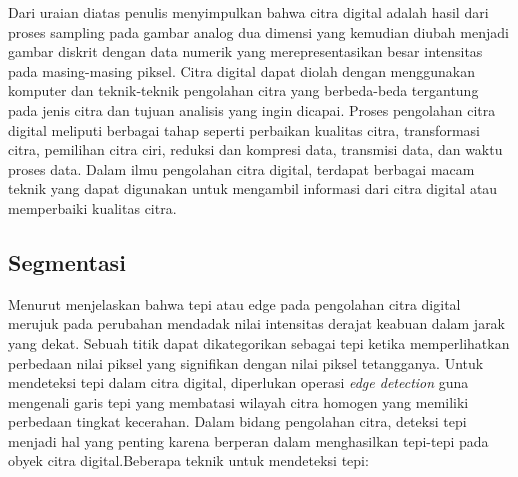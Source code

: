 Dari uraian diatas penulis menyimpulkan bahwa citra digital adalah hasil dari proses sampling pada gambar analog dua dimensi yang kemudian diubah menjadi gambar diskrit dengan data numerik yang merepresentasikan besar intensitas pada masing-masing piksel. Citra digital dapat diolah dengan menggunakan komputer dan teknik-teknik pengolahan citra yang berbeda-beda tergantung pada jenis citra dan tujuan analisis yang ingin dicapai. Proses pengolahan citra digital meliputi berbagai tahap seperti perbaikan kualitas citra, transformasi citra, pemilihan citra ciri, reduksi dan kompresi data, transmisi data, dan waktu proses data. Dalam ilmu pengolahan citra digital, terdapat berbagai macam teknik yang dapat digunakan untuk mengambil informasi dari citra digital atau memperbaiki kualitas citra.

\subsection{Segmentasi}

Menurut \textcite{IPI1759345} menjelaskan bahwa tepi atau edge pada pengolahan citra digital merujuk pada perubahan mendadak nilai intensitas derajat keabuan dalam jarak yang dekat. Sebuah titik dapat dikategorikan sebagai tepi ketika memperlihatkan perbedaan nilai piksel yang signifikan dengan nilai piksel tetangganya. Untuk mendeteksi tepi dalam citra digital, diperlukan operasi \textit{edge detection} guna mengenali garis tepi yang membatasi wilayah citra homogen yang memiliki perbedaan tingkat kecerahan. Dalam bidang pengolahan citra, deteksi tepi menjadi hal yang penting karena berperan dalam menghasilkan tepi-tepi pada obyek citra digital.Beberapa teknik untuk mendeteksi tepi:

